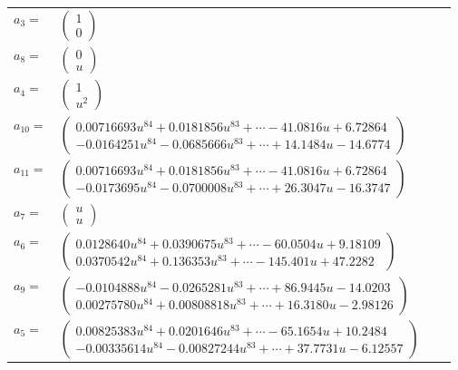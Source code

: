 \documentclass[1p]{elsarticle_modified}
\theoremstyle{definition}
\begin{document}
\begin{tabular}{m{7pt} m{180pt} m{7pt} m{180pt} }
\flushright $a_{3}=$&$\begin{pmatrix}1\\0\end{pmatrix}$ \\
\flushright $a_{8}=$&$\begin{pmatrix}0\\u\end{pmatrix}$ \\
\flushright $a_{4}=$&$\begin{pmatrix}1\\u^2\end{pmatrix}$ \\
\flushright $a_{10}=$&$\begin{pmatrix}0.00716693 u^{84}+0.0181856 u^{83}+\cdots-41.0816 u+6.72864\\-0.0164251 u^{84}-0.0685666 u^{83}+\cdots+14.1484 u-14.6774\end{pmatrix}$ \\
\flushright $a_{11}=$&$\begin{pmatrix}0.00716693 u^{84}+0.0181856 u^{83}+\cdots-41.0816 u+6.72864\\-0.0173695 u^{84}-0.0700008 u^{83}+\cdots+26.3047 u-16.3747\end{pmatrix}$ \\
\flushright $a_{7}=$&$\begin{pmatrix}u\\u\end{pmatrix}$ \\
\flushright $a_{6}=$&$\begin{pmatrix}0.0128640 u^{84}+0.0390675 u^{83}+\cdots-60.0504 u+9.18109\\0.0370542 u^{84}+0.136353 u^{83}+\cdots-145.401 u+47.2282\end{pmatrix}$ \\
\flushright $a_{9}=$&$\begin{pmatrix}-0.0104888 u^{84}-0.0265281 u^{83}+\cdots+86.9445 u-14.0203\\0.00275780 u^{84}+0.00808818 u^{83}+\cdots+16.3180 u-2.98126\end{pmatrix}$ \\
\flushright $a_{5}=$&$\begin{pmatrix}0.00825383 u^{84}+0.0201646 u^{83}+\cdots-65.1654 u+10.2484\\-0.00335614 u^{84}-0.00827244 u^{83}+\cdots+37.7731 u-6.12557\end{pmatrix}$ \\

\end{tabular}
\end{document}
